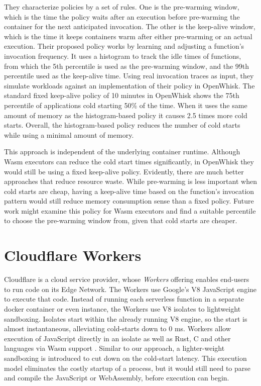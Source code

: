 They characterize policies by a set of rules. One is the pre-warming window, which is the time the policy waits after an execution before pre-warming the container for the next anticipated invocation. The other is the keep-alive window, which is the time it keeps containers warm after either pre-warming or an actual execution.
Their proposed policy works by learning and adjusting a function's invocation frequency. It uses a histogram to track the idle times of functions, from which the 5th percentile is used as the pre-warming window, and the 99th percentile used as the keep-alive time.
Using real invocation traces as input, they simulate workloads against an implementation of their policy in OpenWhisk. The standard fixed keep-alive policy of 10 minutes in OpenWhisk shows the 75th percentile of applications cold starting 50\% of the time. When it uses the same amount of memory as the histogram-based policy it causes 2.5 times more cold starts. Overall, the histogram-based policy reduces the number of cold starts while using a minimal amount of memory.

This approach is independent of the underlying container runtime. Although Wasm executors can reduce the cold start times significantly, in OpenWhisk they would still be using a fixed keep-alive policy. Evidently, there are much better approaches that reduce resource waste. While pre-warming is less important when cold starts are cheap, having a keep-alive time based on the function's invocation pattern would still reduce memory consumption sense than a fixed policy. Future work might examine this policy for Wasm executors and find a suitable percentile to choose the pre-warming window from, given that cold starts are cheaper.

\section{Cloudflare Workers}

Cloudflare is a cloud service provider, whose \emph{Workers} offering enables end-users to run code on its Edge Network. The Workers use Google's V8 JavaScript engine to execute that code.
Instead of running each serverless function in a separate docker container or even  instance, the Workers use V8 isolates to lightweight sandboxing. Isolates start within the already running V8 engine, so the start is almost instantaneous, alleviating cold-starts down to 0 ms.
Workers allow execution of JavaScript directly in an isolate as well as Rust, C and other languages via Wasm support \cite{Cloudflare2021}.
Similar to our approach, a lighter-weight sandboxing is introduced to cut down on the cold-start latency. This execution model eliminates the costly startup of a  process, but it would still need to parse and compile the JavaScript or WebAssembly, before execution can begin.

